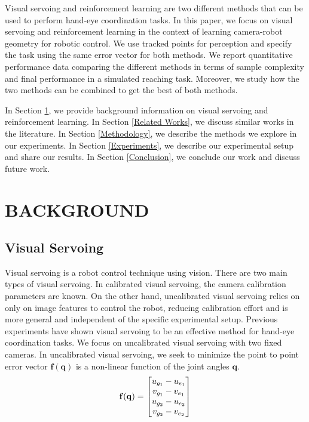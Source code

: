 \documentclass[letterpaper, 10 pt, conference]{ieeeconf}  %
\begin{document}
Visual servoing and reinforcement learning are two different methods that can be
used to perform hand-eye coordination tasks. In this paper, we focus on visual
servoing and reinforcement learning in the context of learning camera-robot
geometry for robotic control. We use tracked points for perception and specify
the task using the same error vector for both methods. We report quantitative
performance data comparing the different methods in terms of sample complexity
and final performance in a simulated reaching task. Moreover, we study how
the two methods can be combined to get the best of both methods.

In Section \ref{Background}, we provide background information on visual
servoing and reinforcement learning. In Section \ref{Related Works}, we discuss
similar works in the literature. In Section \ref{Methodology}, we describe
the methods we explore in our experiments. In Section \ref{Experiments}, we
describe our experimental setup and share our results. In Section
\ref{Conclusion}, we conclude our work and discuss future work.

\section{BACKGROUND} \label{Background}

\subsection{Visual Servoing}

Visual servoing is a robot control technique using vision. There are two main
types of visual servoing. In calibrated visual servoing, the camera calibration
parameters are known. \cite{Chaumette2006} On the other hand, uncalibrated
visual servoing relies on only on image features to control the robot, reducing
calibration effort and is more general and independent of the specific
experimental setup. Previous experiments have shown visual servoing to be an
effective method for hand-eye coordination tasks. \cite{Jagersand1997} We focus
on uncalibrated visual servoing with two fixed cameras. In uncalibrated visual
servoing, we seek to minimize the point to point error vector
$\mathbf{f}(\mathbf{q})$ is a non-linear function of the joint angles
$\mathbf{q}$.
\begin{equation}
    \mathbf{f}(\mathbf{q}) = \begin{bmatrix}
        u_{g_1} - u_{e_1} \cr
        v_{g_1} - v_{e_1} \cr
        u_{g_2} - u_{e_2} \cr
        v_{g_2} - v_{e_2}
    \end{bmatrix}
\end{equation}
\end{document}
